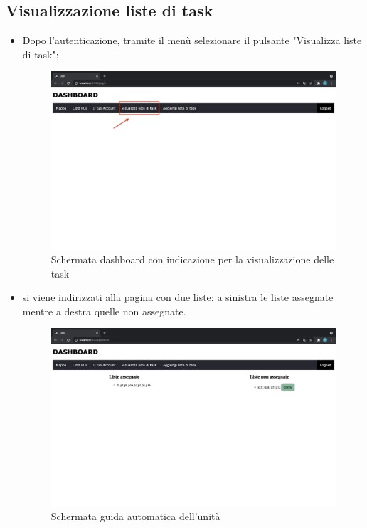 \subsection{Visualizzazione liste di task}
\begin{itemize}
    \item Dopo l'autenticazione, tramite il menù selezionare il pulsante "Visualizza liste di task";
    \begin{figure}[H]
        \centering
        \includegraphics[scale=0.2]{res/images/dashboard8.png}
        \caption{Schermata dashboard con indicazione per la visualizzazione delle task}
    \end{figure}
    \item si viene indirizzati alla pagina con due liste: a sinistra le liste assegnate mentre a destra quelle non assegnate.
    \begin{figure}[H]
        \centering
        \includegraphics[scale=0.2]{res/images/tasklist.png}
        \caption{Schermata guida automatica dell'unità}

\end{figure}
\end{itemize}

